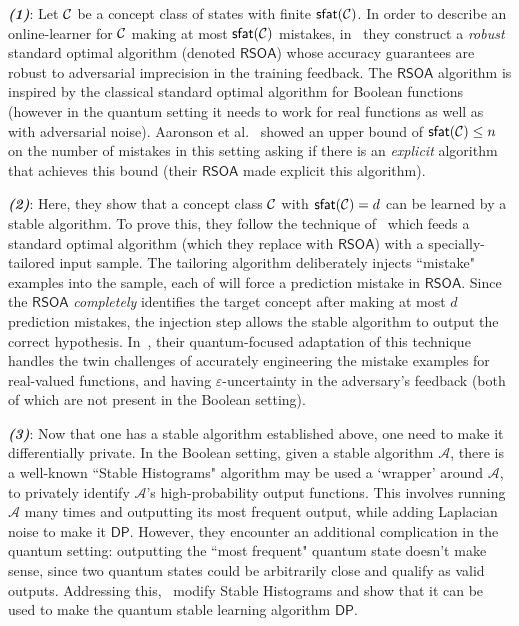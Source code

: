 \documentclass[11pt]{article}
\newcommand{\RSOA}{\ensuremath{\mathsf{RSOA}}}
\newcommand{\sfat}{\ensuremath{\mathsf{sfat}}}
\newcommand{\DP}{\ensuremath{\mathsf{DP}}}
\newcommand{\calC}{{\cal C }}
\begin{document}
 \emph{\textbf{(1)}}: Let $\calC$ be a concept class of states with  finite $\sfat(\calC)$. In order to describe an online-learner for $\calC$ making at most $\sfat(\calC)$ mistakes, in~\cite{DBLP:conf/nips/QuekAS21} they construct a \emph{robust} standard optimal algorithm (denoted $\RSOA$) whose accuracy guarantees are robust to adversarial imprecision in the training feedback. The $\RSOA$ algorithm is inspired by the classical standard optimal algorithm for Boolean functions (however in the quantum setting it needs to work for real functions as well as with adversarial noise).  Aaronson et  al.~\cite{aaronson2018online} showed an upper bound of $\sfat(\calC)\leq n$ on the number of mistakes in this setting asking if there is an \emph{explicit} algorithm that achieves this bound (their $\RSOA$ made explicit this algorithm). 

\emph{\textbf{(2)}}: Here, they show that a concept class $\calC$ with $\sfat(\calC)=d$  can be learned by a stable algorithm. To prove this, they follow the technique of~\cite{DBLP:conf/focs/BunLM20} which feeds a standard optimal algorithm (which they replace with $\RSOA$) with a specially-tailored input sample. The tailoring algorithm deliberately injects ``mistake" examples into the sample, each of will force a prediction mistake in $\RSOA$. Since the $\RSOA$ {\em completely} identifies the target concept after making at most $d$ prediction mistakes, the injection step allows the stable algorithm to output the correct hypothesis. In~\cite{DBLP:conf/nips/QuekAS21}, their quantum-focused adaptation of this technique handles the twin challenges of accurately engineering the mistake examples for real-valued functions, and having $\varepsilon$-uncertainty in the adversary's feedback (both of which are not present in the Boolean setting).

  \emph{\textbf{(3)}}:  Now that one has a stable algorithm established above, one need to make it differentially private. In the Boolean setting, given a stable algorithm $\mathcal{A}$, there is a well-known ``Stable Histograms" algorithm may be used a `wrapper' around $\mathcal{A}$, to privately identify $\mathcal{A}$'s high-probability output functions. This involves running $\mathcal{A}$ many times and outputting its most frequent output, while adding Laplacian noise to make it $\DP$. However, they encounter an additional complication in the quantum setting: outputting the ``most frequent" quantum state doesn't make sense, since two quantum states could be arbitrarily close and qualify as valid outputs. Addressing this,~\cite{DBLP:conf/nips/QuekAS21} modify Stable Histograms and show that it can be used to make the quantum stable learning algorithm $\DP$. 
\end{document}
